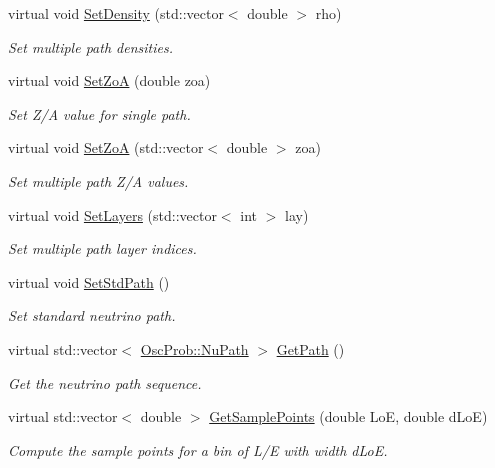 \begin{DoxyCompactItemize}
virtual void \hyperlink{classOscProb_1_1PMNS__Base_a858221d5510fe732dc6a101fd305cda0}{Set\+Density} (std\+::vector$<$ double $>$ rho)
\begin{DoxyCompactList}\small\item\em Set multiple path densities. \end{DoxyCompactList}\item 
virtual void \hyperlink{classOscProb_1_1PMNS__Base_a1bf3ea8fd2507fd2fd82d7410ff8f578}{Set\+ZoA} (double zoa)
\begin{DoxyCompactList}\small\item\em Set Z/A value for single path. \end{DoxyCompactList}\item 
virtual void \hyperlink{classOscProb_1_1PMNS__Base_a8495f8a320e1a21965e6a64aec92ad2a}{Set\+ZoA} (std\+::vector$<$ double $>$ zoa)
\begin{DoxyCompactList}\small\item\em Set multiple path Z/A values. \end{DoxyCompactList}\item 
virtual void \hyperlink{classOscProb_1_1PMNS__Base_a904e580edf89fb98bf9a6397739b4ebe}{Set\+Layers} (std\+::vector$<$ int $>$ lay)
\begin{DoxyCompactList}\small\item\em Set multiple path layer indices. \end{DoxyCompactList}\item 
virtual void \hyperlink{classOscProb_1_1PMNS__Base_add6533a9fc9acdfc7ae258b62570d78d}{Set\+Std\+Path} ()
\begin{DoxyCompactList}\small\item\em Set standard neutrino path. \end{DoxyCompactList}\item 
virtual std\+::vector$<$ \hyperlink{structOscProb_1_1NuPath}{Osc\+Prob\+::\+Nu\+Path} $>$ \hyperlink{classOscProb_1_1PMNS__Base_ac8e196f2e85a2b1caaf705073ee95a5c}{Get\+Path} ()
\begin{DoxyCompactList}\small\item\em Get the neutrino path sequence. \end{DoxyCompactList}\item 
virtual std\+::vector$<$ double $>$ \hyperlink{classOscProb_1_1PMNS__Base_a9eac8d768c1424755ee41f7e783af179}{Get\+Sample\+Points} (double LoE, double d\+LoE)
\begin{DoxyCompactList}\small\item\em Compute the sample points for a bin of L/E with width d\+LoE. \end{DoxyCompactList}\end{DoxyCompactItemize}
